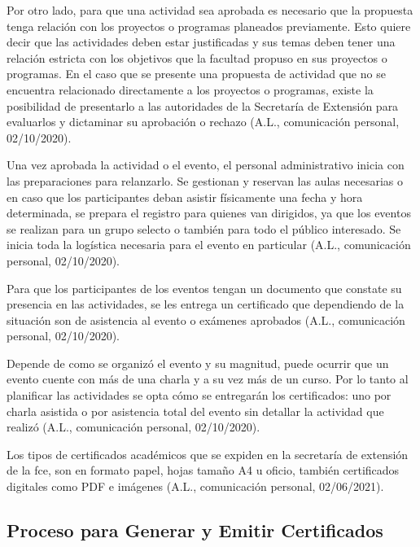 Por otro lado, para que una actividad sea aprobada  es necesario que la 
propuesta tenga relación con los proyectos o programas planeados previamente. Esto quiere decir que las actividades deben estar justificadas y 
sus temas deben tener una relación estricta con los objetivos que la facultad propuso en sus proyectos o programas.
En el caso que se presente una propuesta de actividad que no se encuentra relacionado directamente a los proyectos o programas,
existe la posibilidad de presentarlo a las autoridades de la Secretaría de Extensión para evaluarlos y dictaminar su aprobación o rechazo (A.L., comunicación personal, 02/10/2020).%

Una vez aprobada la actividad o el evento, el personal administrativo 
inicia con las preparaciones para relanzarlo. Se gestionan y reservan
las aulas necesarias o en caso que los participantes deban asistir 
físicamente una fecha y hora determinada, se prepara el registro
para quienes van dirigidos, ya que los eventos 
se realizan para un grupo selecto o también para todo el público interesado.
Se inicia toda la logística necesaria para el evento en particular (A.L., comunicación personal, 02/10/2020).%

Para que los participantes de los eventos tengan un documento que constate
su presencia en las actividades,  se les entrega un certificado que dependiendo
de la situación son de asistencia al evento o exámenes aprobados (A.L., comunicación personal, 02/10/2020).%

Depende de como se  organizó el evento y su magnitud, puede ocurrir que un evento
cuente con más de una charla y a su vez más de un curso. Por lo tanto
al planificar las actividades se opta cómo se entregarán los certificados:
uno por charla asistida o por asistencia total del evento sin detallar la actividad que realizó (A.L., comunicación personal, 02/10/2020).%

Los tipos de certificados académicos que se expiden en la secretaría de extensión de la \gls{fce}, son en formato papel, hojas tamaño A4 u oficio,
también certificados digitales como PDF e imágenes (A.L., comunicación personal, 02/06/2021).%



  
\subsection{Proceso para Generar y Emitir  Certificados}

